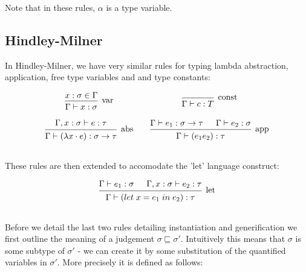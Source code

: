 \begin{appendices}
  Note that in these rules, $\alpha$ is a type variable.

  \subsection {Hindley-Milner}
  \label{appendix:HMrules}
  
  In Hindley-Milner, we have very similar rules for typing lambda
  abstraction, application, free type variables and and type constants:

  \[\begin{array}{c@{\qquad}c}  
      \mbox{\begin{prooftree}
        \hypo{x : \sigma \in \Gamma}
        \infer1[var]{\Gamma \vdash x : \sigma}
      \end{prooftree}}
      &
      \mbox{\begin{prooftree}
        \infer0[const]{\Gamma \vdash c : T}
      \end{prooftree}}
      \\\\
      \mbox{\begin{prooftree}
        \hypo{\Gamma , x : \sigma \vdash e : \tau }
        \infer1[abs]{\Gamma \vdash (\lambda x \cdot e) : \sigma \to \tau}
      \end{prooftree}}
      &
      \mbox{\begin{prooftree}
        \hypo{\Gamma \vdash e_1 : \sigma \to \tau}
        \hypo{\Gamma \vdash e_2 : \sigma}
        \infer2[app]{\Gamma \vdash (e_1 e_2) : \tau}
      \end{prooftree}}
      \\\\      
  \end{array} \]

  These rules are then extended to accomodate the 'let' language
  construct:

    \[\begin{array}{c}  
      \mbox{\begin{prooftree}
        \hypo{\Gamma \vdash e_1 : \sigma}
        \hypo{\Gamma, x : \sigma \vdash e_2 : \tau }
        \infer2[let]{\Gamma \vdash (let\; x = e_1\; in\; e_2) : \tau}
      \end{prooftree}}
      \\\\
    \end{array} \]

  Before we detail the last two rules detailing instantiation and
  generification we first outline the meaning of a judgement $\sigma
  \sqsubseteq \sigma'$. Intuitively this means that $\sigma$ is some
  subtype of $\sigma'$ - we can create it by some substitution of the
  quantified variables in $\sigma'$. More precisely it is defined as
  follows:


\end{appendices}
